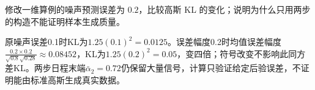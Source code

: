 \begin{exercises}
\begin{exercise} 修改一维算例的噪声预测误差为 $0.2$，比较高斯 KL 的变化；说明为什么只用两步的构造不能证明样本生成质量。

\begin{solution}
原噪声误差0.1时KL为$1.25(0.1)^2=0.0125$。误差幅度0.2时均值误差幅度$\frac{0.2\times0.2}{\sqrt{0.8}\sqrt{0.28}}\approx0.08452$，KL为$1.25(0.2)^2=0.05$，变四倍；符号改变不影响此同方差KL。两步日程末端$\bar\alpha_2=0.72$仍保留大量信号，计算只验证给定后验误差，不证明能由标准高斯生成真实数据。
\end{solution}
\end{exercise}

\end{exercises}
